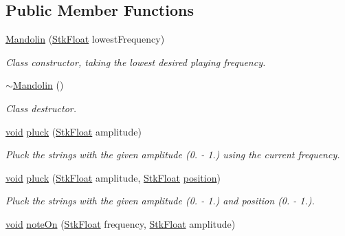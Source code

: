 \subsection*{Public Member Functions}
\begin{DoxyCompactItemize}
\item 
\hyperlink{class_nyq_1_1_mandolin_a7af3056c99caa848fd092d6682457053}{Mandolin} (\hyperlink{namespace_nyq_a044fa20a706520a617bbbf458a7db7e4}{Stk\+Float} lowest\+Frequency)
\begin{DoxyCompactList}\small\item\em Class constructor, taking the lowest desired playing frequency. \end{DoxyCompactList}\item 
\hyperlink{class_nyq_1_1_mandolin_adb12d275d84c9300292e7e74fe0ef0a7}{$\sim$\+Mandolin} ()
\begin{DoxyCompactList}\small\item\em Class destructor. \end{DoxyCompactList}\item 
\hyperlink{sound_8c_ae35f5844602719cf66324f4de2a658b3}{void} \hyperlink{class_nyq_1_1_mandolin_ad1ab31c46b04684cd384318fc0adf256}{pluck} (\hyperlink{namespace_nyq_a044fa20a706520a617bbbf458a7db7e4}{Stk\+Float} amplitude)
\begin{DoxyCompactList}\small\item\em Pluck the strings with the given amplitude (0. -\/ 1.) using the current frequency. \end{DoxyCompactList}\item 
\hyperlink{sound_8c_ae35f5844602719cf66324f4de2a658b3}{void} \hyperlink{class_nyq_1_1_mandolin_aa1337f148dc67e15227fd5afd27c4874}{pluck} (\hyperlink{namespace_nyq_a044fa20a706520a617bbbf458a7db7e4}{Stk\+Float} amplitude, \hyperlink{namespace_nyq_a044fa20a706520a617bbbf458a7db7e4}{Stk\+Float} \hyperlink{structposition}{position})
\begin{DoxyCompactList}\small\item\em Pluck the strings with the given amplitude (0. -\/ 1.) and position (0. -\/ 1.). \end{DoxyCompactList}\item 
\hyperlink{sound_8c_ae35f5844602719cf66324f4de2a658b3}{void} \hyperlink{class_nyq_1_1_mandolin_ade00574d8d130666f14c4e8c098abe33}{note\+On} (\hyperlink{namespace_nyq_a044fa20a706520a617bbbf458a7db7e4}{Stk\+Float} frequency, \hyperlink{namespace_nyq_a044fa20a706520a617bbbf458a7db7e4}{Stk\+Float} amplitude)

\end{DoxyCompactItemize}
